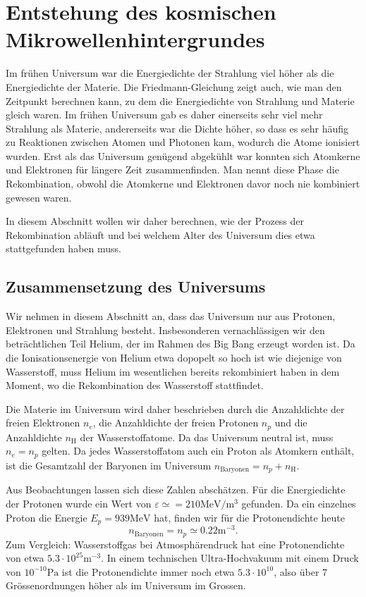 \section{Entstehung des kosmischen Mikrowellenhintergrundes%
\label{skript:cmb:section:rekombination}}
Im frühen Universum war die Energiedichte der Strahlung viel höher
als die Energiedichte der Materie.
Die Friedmann-Gleichung zeigt auch, wie man den Zeitpunkt berechnen
kann, zu dem die Energiedichte von Strahlung und Materie gleich
waren.
Im frühen Universum gab es daher einerseits sehr viel mehr Strahlung
als Materie, andererseits war die Dichte höher, so dass es sehr
häufig zu Reaktionen zwischen Atomen und Photonen kam, wodurch die
Atome ionisiert wurden.
Erst als das Universum genügend abgekühlt war konnten sich Atomkerne
und Elektronen für längere Zeit zusammenfinden.
Man nennt diese Phase die Rekombination, obwohl die Atomkerne und
Elektronen davor noch nie kombiniert gewesen waren.

In diesem Abschnitt wollen wir daher berechnen, wie der Prozess der
Rekombination abläuft und bei welchem Alter des Universum dies
etwa stattgefunden haben muss.

\subsection{Zusammensetzung des Universums%
\label{section:cmb:dichte}}
Wir nehmen in diesem Abschnitt an, dass das Universum nur aus 
Protonen, Elektronen und Strahlung besteht.
Insbesonderen vernachlässigen wir den beträchtlichen Teil
Helium, der im Rahmen des Big Bang erzeugt worden ist.
Da die Ionisationsenergie von Helium etwa dopopelt so hoch ist wie
diejenige von Wasserstoff, muss Helium im wesentlichen bereits
rekombiniert haben in dem Moment, wo die Rekombination des Wasserstoff
stattfindet.

Die Materie im Universum wird daher beschrieben durch die Anzahldichte
der freien Elektronen $n_e$, die Anzahldichte der freien Protonen $n_p$
und die Anzahldichte $n_\text{H}$ der Wasserstoffatome.
Da das Universum neutral ist, muss $n_e=n_p$ gelten.
Da jedes Wasserstoffatom auch ein Proton als Atomkern enthält, ist die
Gesamtzahl der Baryonen im Universum $n_\text{Baryonen} = n_p+n_\text{H}$.

Aus Beobachtungen lassen sich diese Zahlen abschätzen.
Für die Energiedichte der Protonen wurde ein Wert von
$\varepsilon \simeq = 210\text{MeV}/\text{m}^3$ gefunden.
Da ein einzelnes Proton die Energie $E_p=939\text{MeV}$ hat, finden wir
für die Protonendichte heute
\[
n_{\text{Baryonen}}
=
n_p
\simeq
0.22 \text{m}^{-3}.
\]
Zum Vergleich: Wasserstoffgas bei Atmosphärendruck hat eine Protonendichte
von etwa $5.3\cdot 10^{25}\text{m}^{-3}$.
In einem technischen Ultra-Hochvakuum mit einem Druck von
$10^{-10}\text{Pa}$ ist die Protonendichte immer noch
etwa $5.3\cdot 10^{10}$, also über 7 Grössenordnungen höher als im 
Universum im Grossen.

